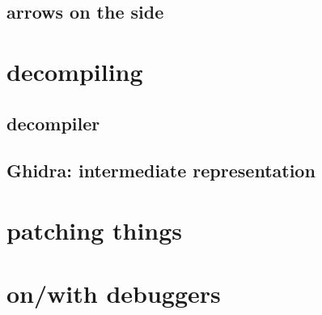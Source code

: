 \subsection{arrows on the side}


\section{decompiling}

\subsection{decompiler}


\subsection{Ghidra: intermediate representation}


\section{patching things}


\section{on/with debuggers}





